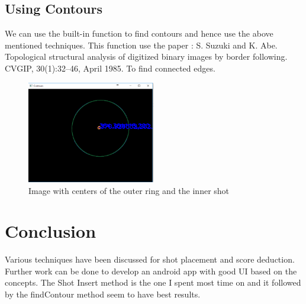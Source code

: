 \documentclass[10pt,twocolumn,letterpaper]{article}
\begin{document}
\subsection{Using Contours}
We can use the built-in function to find contours and hence use the above mentioned techniques. This function use the paper : S. Suzuki and K. Abe. Topological structural analysis of digitized binary images by border following. CVGIP, 30(1):32–46, April 1985.
To find connected edges.
\begin{figure}[h]
	\centering
	\includegraphics[width=0.5\textwidth]{contour}
	\caption{Image with centers of the outer ring and the inner shot}
	\label{contourImage}
\end{figure}
\section{Conclusion}

Various techniques have been discussed for shot placement and score deduction. Further work can be done to develop an android app with good UI based on the concepts.
The Shot Insert method is the one I spent most time on and it followed by the findContour method seem to have best results.

{\small


}
\end{document}
